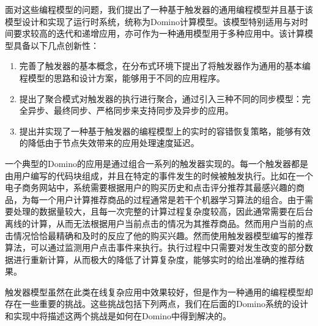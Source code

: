 面对这些编程模型的问题，我们提出了一种基于触发器的通用编程模型并且基于该模型设计和实现了运行时系统，统称为Domino计算模型。该模型特别适用与对时间要求较高的迭代和递增应用，亦可作为一种通用模型用于多种应用中。该计算模型具备以下几点创新性：

\begin{enumerate}
\item 完善了触发器的基本概念，在分布式环境下提出了将触发器作为通用的基本编程模型的思路和设计方案，能够用于不同的应用程序。

\item 提出了聚合模式对触发器的执行进行聚合，通过引入三种不同的同步模型：完全异步、最终同步、严格同步来支持同步及异步的应用。

\item 提出并实现了一种基于触发器的编程模型上的实时的容错恢复策略，能够有效的降低由于节点失效带来的应用处理速度延迟。
\end{enumerate}

一个典型的Domino的应用是通过组合一系列的触发器实现的。每一个触发器都是由用户编写的代码块组成，并且在特定的事件发生的时候被触发执行。比如在一个电子商务网站中，系统需要根据用户的购买历史和点击评分推荐其最感兴趣的商品，为每一个用户计算推荐商品的过程通常是若干个机器学习算法的组合。由于需要处理的数据量较大，且每一次完整的计算过程复杂度较高，因此通常需要在后台离线的计算，从而无法根据用户当前点击的情况为其推荐商品。然而用户当前的点击情况恰恰最精确和及时的反应了他的购买兴趣。然而使用触发器模型编写的推荐算法，可以通过监测用户点击事件来执行。执行过程中只需要对发生改变的部分数据进行重新计算，从而极大的降低了计算复杂度，能够实时的给出准确的推荐结果。

触发器模型虽然在此类在线复杂应用中效果较好，但是作为一种通用的编程模型却存在一些重要的挑战。这些挑战包括下列两点，我们在后面的Domino系统的设计和实现中将描述这两个挑战是如何在Domino中得到解决的。

